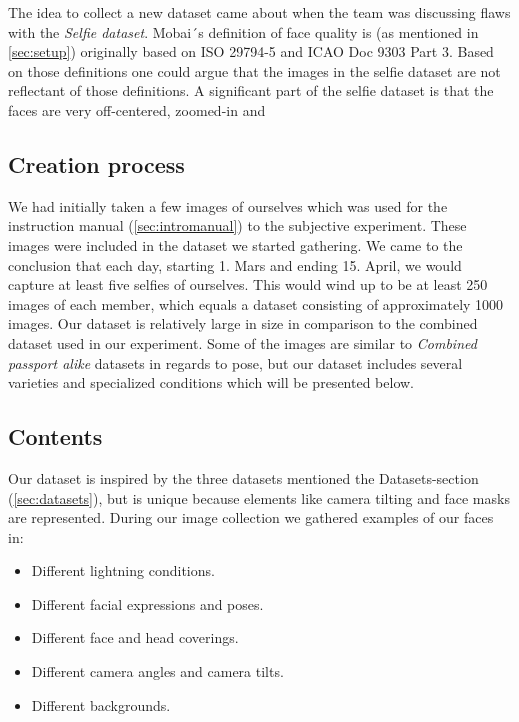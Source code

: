 The idea to collect a new dataset came about when the team was discussing flaws with the \textit{Selfie dataset}. Mobai´s definition of face quality is (as mentioned in \ref{sec:setup}) originally based on ISO 29794-5 and ICAO Doc 9303 Part 3. Based on those definitions one could argue that the images in the selfie dataset are not reflectant of those definitions. A significant part of the selfie dataset is that the faces are very off-centered, zoomed-in and 

\subsection*{Creation process}
We had initially taken a few images of ourselves which was used for the instruction manual (\ref{sec:intromanual}) to the subjective experiment. These images were included in the dataset we started gathering. We came to the conclusion that each day, starting 1. Mars and ending 15. April, we would capture at least five selfies of ourselves. This would wind up to be at least 250 images of each member, which equals a dataset consisting of approximately 1000 images. Our dataset is relatively large in size in comparison to the combined dataset used in our experiment. Some of the images are similar to \textit{Combined passport alike} datasets in regards to pose, but our dataset includes several varieties and specialized conditions which will be presented below. 

\subsection*{Contents}
Our dataset is inspired by the three datasets mentioned the Datasets-section (\ref{sec:datasets}), but is unique because elements like camera tilting and face masks are represented. During our image collection we gathered examples of our faces in: 

\begin{itemize}
    \item Different lightning conditions.
    \item Different facial expressions and poses.
    \item Different face and head coverings. 
    \item Different camera angles and camera tilts.
    \item Different backgrounds. 
\end{itemize}




